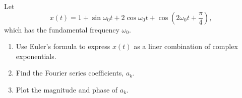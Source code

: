 \begin{frame}[plain]
    \begin{example}
        Let
        \begin{equation*}
            x(t) = 1 + \sin \omega_0t + 2\cos\omega_0t+ \cos\left(2\omega_0t+ \frac{\pi}{4}\right),
        \end{equation*}
        which has the fundamental frequency $\omega_0$.
        \begin{enumerate}
            \item Use Euler's formula to express $x(t)$ as a liner combination of complex exponentials.
            \item Find the Fourier series coefficients, $a_k$.
            \item Plot the magnitude and phase of $a_k$.
        \end{enumerate}

    \end{example}
\end{frame}

